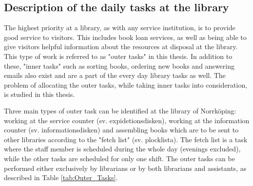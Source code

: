 \subsection{Description of the daily tasks at the library} \label{section:library_tasks}
The highest priority at a library, as with any service institution, is to provide good service to visitors. This includes book loan services, as well as being able to give visitors helpful information about the resources at disposal at the library. This type of work is referred to as "outer tasks" in this thesis. In addition to these, "inner tasks" such as sorting books, ordering new books and answering emails also exist and are a part of the every day library tasks as well. The problem of allocating the outer tasks, while taking inner tasks into consideration, is studied in this thesis.

Three main types of outer task can be identified at the library of Norrköping: working at the service counter (sv. expidetionsdisken), working at the information counter (sv. informationsdisken) and assembling books which are to be sent to other libraries according to the "fetch list" (sv. plocklista). The fetch list is a task where the staff member is scheduled during the whole day (evenings excluded), while the other tasks are scheduled for only one shift. The outer tasks can be performed either exclusively by librarians or by both librarians and assistants, as described in Table \ref{tab:Outer_Tasks}.

